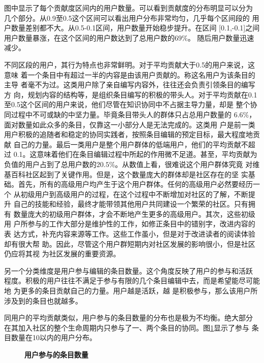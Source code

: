 图中显示了每个贡献度区间内的用户数量。可以看到贡献度的分布明显可以分为
几个部分。从0.9至0.5这个区间可以看出用户分布非常均匀，几乎每个区间段的
用户数量差别都不大。从0.5-0.1区间，用户数量开始稳步提升。在区间
[0.1,-0.1]之间用户数量暴涨，在这个区间的用户数达到了总用户数的$69\%$。
随后用户数量迅速减少。

不同区段的用户，其行为特点也非常鲜明。对于平均贡献大于0.5的用户来说，这意味
着一个条目中有超过一半的内容是由该用户贡献的。称这名用户为该条目的主导
者毫不为过。这类用户除了亲自编写内容外，往往还会负责引领条目的编写方
向，规划内容的结构等，是组织条目编写的积极的带头人。对于平均贡献在0.1
至0.5这个区间的用户来说，他们尽管在知识协同中不占据主导力量，却是
整个协同过程中不可或缺的中坚力量。毕竟条目带头人的群体只占总用户数量的
$6.6\%$，面对数量如此众多的条目，仅靠这一小部分人是无法完成的。这类用
户是前一类用户积极的追随者和稳定的协同实践者，按照条目编辑的预定目标，最大程度地贡献
自己的力量。最后一类用户是整个用户群体的低端用户，他们的平均贡献不超过
0.1。这意味着他们在条目编辑过程中所起的作用微不足道。甚至，平均贡献为
负值的用户占到了总用户数的$20.5\%$。从数值上看，很难说这个用户群体究竟
对维基百科社区起到了关键作用。但是，这个数量庞大的群体却是社区存在的坚
实基础。首先，所有的高级用户均产生于这个用户群体。任何的高级用户必然要经历一个
从初级用户到高级用户的过程，在这个过程中不断增加对社区的了解，不断提升
自己的技能和经验，最终才能带领其他用户共同建设一个繁荣的社区。只有拥有
数量庞大的初级用户群体，才会不断地产生更多的高级用户。其次，这些初级用
户所参与的工作大部分是维护性的工作，如修正条目中的错别字，改进内容的表
达方式，补充内容来源等工作。这些工作虽小，但是对于改进读者的阅读体验却有很大帮
助。因此，尽管这个用户群短期内对社区发展的影响很小，但是社区仍应将其视
为社区发展的重要资源。

另一个分类维度是用户参与编辑的条目数量。这个角度反映了用户的参与和活跃
程度。积极的用户往往不满足于参与有限的几个条目编辑中去，而是希望能尽可能地
为更多的条目贡献自己的力量。用户越是活跃，越
是积极参与，那么该用户所涉及到的条目也就越多。

同用户的平均贡献类似，用户参与的条目数量的分布也是极为不均衡。绝大部分
在其加入社区的整个生命周期内只参与了一、两个条目的协同。图\ref{fig:user-entry-1}显示了参与
条目数量在10以内的用户分布。
\begin{figure}[htb]
  \centering
 
  \caption{\small{\textbf{用户参与的条目数量}}}
  \label{fig:user-entry-1}
\end{figure}

